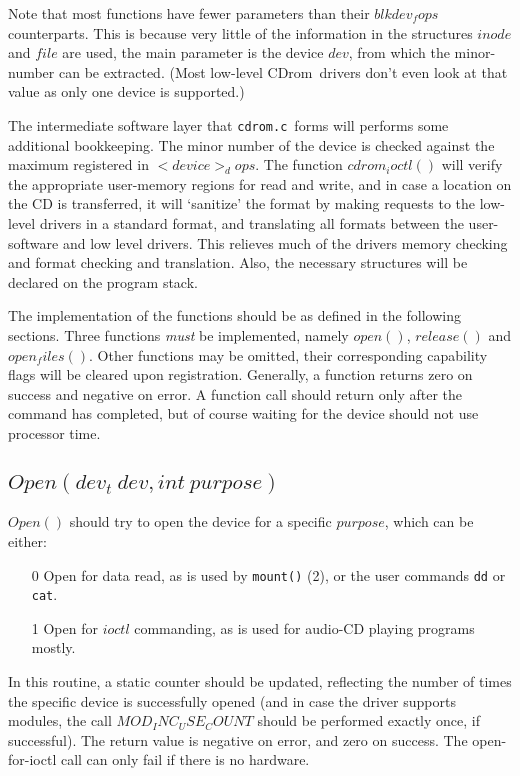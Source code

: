 \documentclass{article}
\def\cdrom{{\sc CDrom}}
\def\cdromc{{\tt cdrom.c}}
\begin{document}
Note that most functions have fewer parameters than their
$blkdev_fops$ counterparts. This is because very little of the
information in the structures $inode$ and $file$ are used, the main
parameter is the device $dev$, from which the minor-number can be
extracted. (Most low-level \cdrom\ drivers don't even look at that value
as only one device is supported.)

The intermediate software layer that \cdromc\ forms will performs some
additional bookkeeping. The minor number of the device is checked
against the maximum registered in $<device>_dops$. The function
$cdrom_ioctl()$ will verify the appropriate user-memory regions for
read and write, and in case a location on the CD is transferred, it
will `sanitize' the format by making requests to the low-level drivers
in a standard format, and translating all formats between the
user-software and low level drivers. This relieves much of the drivers
memory checking and format checking and translation. Also, the
necessary structures will be declared on the program stack.

The implementation of the functions should be as defined in the
following sections. Three functions {\em must\/} be implemented,
namely $open()$, $release()$ and $open_files()$. Other functions may
be omitted, their corresponding capability flags will be cleared upon
registration. Generally, a function returns zero on success and
negative on error. A function call should return only after the
command has completed, but of course waiting for the device should not
use processor time.

\subsection{$Open(dev_t\ dev, int\ purpose)$}

$Open()$ should try to open the device for a specific $purpose$, which
can be either:
\begin{itemize}
\item[0] Open for data read, as is used by {\tt mount()} (2), or the
user commands {\tt dd} or {\tt cat}.  
\item[1] Open for $ioctl$ commanding, as is used for audio-CD playing
programs mostly. 
\end{itemize}
In this routine, a static counter should be updated, reflecting the
number of times the specific device is successfully opened (and in
case the driver supports modules, the call $MOD_INC_USE_COUNT$
should be performed exactly once, if successful). The return value is
negative on error, and zero on success. The open-for-ioctl call can
only fail if there is no hardware.
\end{document}
